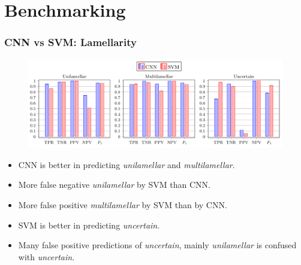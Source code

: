 \documentclass{beamer}
\begin{document}
%
%

\section{Benchmarking}

\begin{frame}
\frametitle{CNN vs SVM: Lamellarity}

\begin{figure}
\centering
\includegraphics[width=\linewidth,height=0.8\textheight,keepaspectratio]{cnn_vs_svm_lamellarity.png} 
\end{figure}

\begin{itemize}
\item CNN is better in predicting \textit{unilamellar} and \textit{multilamellar}.
\item More false negative \textit{unilamellar} by SVM than CNN.
\item More false positive \textit{multilamellar} by SVM than by CNN.
\item SVM is better in predicting \textit{uncertain}.
\item Many false positive predictions of \textit{uncertain}, mainly \textit{unilamellar} is confused with \textit{uncertain}.
\end{itemize}

\end{frame}
\end{document}
